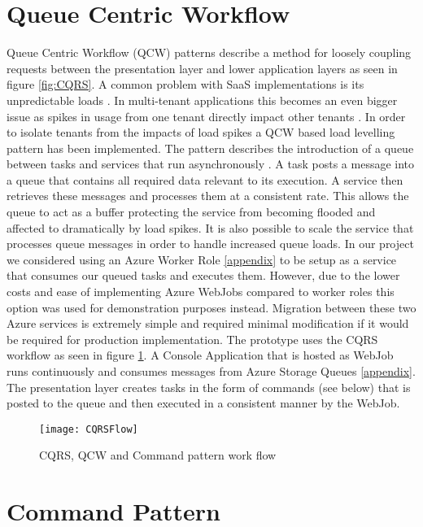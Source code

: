 \section{Queue Centric Workflow}
\label{sec:qcw}
 Queue Centric Workflow (QCW) patterns describe a method for loosely coupling requests between the presentation layer and lower application layers as seen in figure \ref{fig:CQRS}. A common problem with SaaS  implementations is its unpredictable loads \cite{Homer2014}. In multi-tenant applications this becomes an even bigger issue as spikes in usage from one tenant directly impact other tenants \cite{Betts2012-ad}. In order to isolate tenants from the impacts of load spikes a QCW based load levelling pattern has been implemented. The pattern describes the introduction of a queue between tasks and services that run asynchronously \cite{Wilder2012-so}. A task posts a message into a queue that contains all required data relevant to its execution. A service then retrieves these messages and processes them at a consistent rate. This allows the queue to act as a buffer protecting the service from becoming flooded and affected to dramatically by load spikes.
It is also possible to scale the service that processes queue messages in order to handle increased queue loads. In our project we considered using an Azure Worker Role \ref{appendix} to be setup as a service that consumes our queued tasks and executes them. However, due to the lower costs and ease of implementing Azure WebJobs compared to worker roles this option was used for demonstration purposes instead. Migration between these two Azure services is extremely simple and required minimal modification if it would be required for production implementation. The prototype uses the CQRS workflow as seen in figure \ref{fig:CQRSFlow}. A Console Application that is hosted as WebJob runs continuously and consumes messages from Azure Storage Queues \ref{appendix}. The presentation layer creates tasks in the form of commands (see below) that is posted to the queue and then executed in a consistent manner by the WebJob.
 
\begin{figure}
\centering
\texttt{[image: CQRSFlow]}
\caption{CQRS, QCW and Command pattern work flow}
\label{fig:CQRSFlow}
\end{figure}
 
 
 \section{Command Pattern}
 
